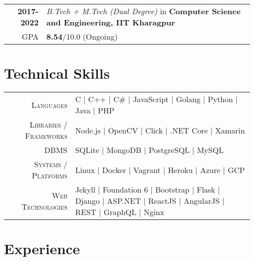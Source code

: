\documentclass[a4paper,10pt]{extarticle} %
\begin{document}
\begin{tabular}{r|p{17.5cm}}	
\textbf{2017-2022} & \textit{B.Tech + M.Tech (Dual Degree)} in \textbf{Computer Science and Engineering, IIT Kharagpur}\\
\hfill GPA & \textbf{8.54}/10.0 (Ongoing)\\
\end{tabular}


\section{\textcolor{primary}{Technical Skills}}

\begin{tabular}{r|p{15cm}}
\textsc{Languages} & C | C++ | C\# | JavaScript | Golang | Python | Java | PHP \\
\textsc{Libraries / Frameworks} & Node.js | OpenCV | Click | .NET Core | Xamarin \\
\textsc{DBMS} & SQLite | MongoDB | PostgreSQL | MySQL \\
\textsc{Systems / Platforms} & Linux | Docker | Vagrant | Heroku | Azure | GCP \\
\textsc{Web Technologies} & Jekyll | Foundation 6 | Bootstrap | Flask | Django | ASP.NET | ReactJS | AngularJS | REST | GraphQL | Nginx \\
\end{tabular}

\vspace{-0.3cm}
\section{\textcolor{primary}{Experience}}
\end{document}
